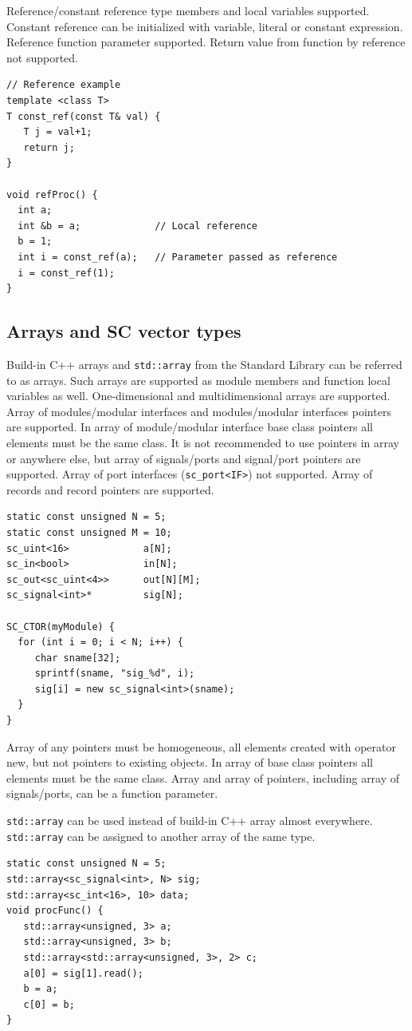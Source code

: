 Reference/constant reference type members and local variables supported. Constant reference can be initialized with variable, literal or constant expression. Reference function parameter supported. Return value from function by reference not supported. 
%
\begin{lstlisting}[style=mycpp]
// Reference example
template <class T>
T const_ref(const T& val) {
   T j = val+1;
   return j;
}

void refProc() {
  int a;
  int &b = a;             // Local reference
  b = 1;
  int i = const_ref(a);   // Parameter passed as reference
  i = const_ref(1);
}
\end{lstlisting}


\subsection{Arrays and SC vector types}

Build-in C++ arrays and {\tt std::array} from the Standard Library can be referred to as arrays.
Such arrays are supported as module members and function local variables as well. One-dimensional and multidimensional arrays are supported. Array of modules/modular interfaces and modules/modular interfaces pointers are supported. In array of module/modular interface base class pointers all elements must be the same class. It is not recommended to use pointers in array or anywhere else, but array of signals/ports and signal/port pointers are supported. Array of port interfaces ({\tt sc\_port<IF>}) not supported. Array of records and record pointers are supported. 
%
\begin{lstlisting}[style=mycpp]
static const unsigned N = 5;   
static const unsigned M = 10;   
sc_uint<16>  		    a[N];
sc_in<bool>             in[N];
sc_out<sc_uint<4>>      out[N][M];
sc_signal<int>*     	sig[N];

SC_CTOR(myModule) {
  for (int i = 0; i < N; i++) {
     char sname[32];
     sprintf(sname, "sig_%d", i); 
     sig[i] = new sc_signal<int>(sname);
  }   
}
\end{lstlisting}
%
Array of any pointers must be homogeneous, all elements created with operator new, but not pointers to existing objects. In array of base class pointers all elements must be the same class. Array and array of pointers, including array of signals/ports, can be a function parameter. 

{\tt std::array} can be used instead of build-in C++ array almost everywhere. {\tt std::array} can be assigned to another array of the same type. 
%
\begin{lstlisting}[style=mycpp]
static const unsigned N = 5;
std::array<sc_signal<int>, N> sig;
std::array<sc_int<16>, 10> data;
void procFunc() {
   std::array<unsigned, 3> a;
   std::array<unsigned, 3> b;
   std::array<std::array<unsigned, 3>, 2> c;   
   a[0] = sig[1].read();
   b = a;
   c[0] = b;
}
\end{lstlisting}

